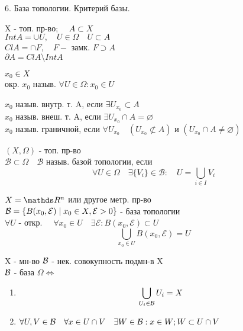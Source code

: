 \documentclass[11pt, fleqn]{article}
\begin{document}
    \begin{question}{6. База топологии. Критерий базы.}
        \begin{definition}
            X - топ. пр-во; $\quad A \subset X$ \\
            $Int A = \cup U, \quad U \in \Omega \quad U \subset A$\\
            $Cl A = \cap F, \quad F - $ замк. $F \supset A$ \\
            $\partial A = Cl A \setminus Int A$
        \end{definition}

        \begin{definition}
            $x_0 \in X$\\
            окр. $x_0$ назыв. $\forall U \in \Omega: x_0 \in U$
        \end{definition}

        \begin{definition}
            $x_0$ назыв. внутр. т. A, если $\exists U_{x_0} \subset A$\\
            $x_0$ назыв. внеш. т. A, если $\exists U_{x_0} \cap A = \varnothing$\\
            $x_0$ назыв. граничной, если $\forall U_{x_0} \quad (U_{x_0} \not \subset A)$ и $(U_{x_0} \cap A \neq \varnothing)$
        \end{definition}

        \begin{definition}
            $(X, \Omega)$ - топ. пр-во\\
            $\mathcal{B} \subset \Omega \quad \mathcal{B}$ назыв. базой топологии, если\\
            \[\forall U \in \Omega \quad \exists \{V_i\} \in \mathcal{B}: \quad U = \bigcup_{i \in I} V_i\]
        \end{definition}

        \begin{example}
            $X = \R^n$ или другое метр. пр-во\\
            $\mathcal{B} = \{B(x_0, \mathcal{E}) \; | \; x_0 \in X, \mathcal{E} > 0\}$ - база топологии\\
            $\forall U$ - откр. $\quad \forall x_0 \in U \quad \exists \mathcal{E}: B(x_0, \mathcal{E}) \subset U$\\
            \[\bigcup_{x_0 \in U} B(x_0, \mathcal{E}) = U\]
        \end{example}

        \begin{theorem}
            X - мн-во $\mathcal{B}$ - нек. совокупность подмн-в X\\
            $\mathcal{B}$ - база $\Omega \Leftrightarrow$ \begin{enumerate}
                \item \[\bigcup_{U_i \in \mathcal{B}} U_i = X\]
                \item $\forall U, V \in \mathcal{B} \quad \forall x \in U \cap V \quad \exists W \in \mathcal{B} : x \in W; W \subset U\cap V$
            \end{enumerate}
        \end{theorem}


\end{question}
\end{document}
